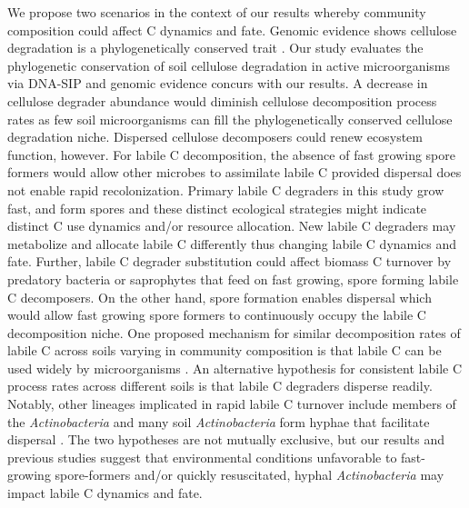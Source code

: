 We propose two scenarios in the context of our results whereby community
composition could affect C dynamics and fate. Genomic evidence shows cellulose
degradation is a phylogenetically conserved trait \citep{Berlemont2013}. Our
study evaluates the phylogenetic conservation of soil cellulose degradation in
active microorganisms via DNA-SIP and genomic evidence concurs with our
results. A decrease in cellulose degrader abundance would diminish cellulose
decomposition process rates as few soil microorganisms can fill the
phylogenetically conserved cellulose degradation niche. Dispersed cellulose
decomposers could renew ecosystem function, however. For labile
C decomposition, the absence of fast growing spore formers would allow other
microbes to assimilate labile C provided dispersal does not enable rapid
recolonization. Primary labile C degraders in this study grow fast, and
form spores and these distinct ecological strategies might indicate distinct
C use dynamics and/or resource allocation. New labile C degraders may
metabolize and allocate labile C differently thus changing labile C dynamics
and fate. Further, labile C degrader substitution could affect biomass
C turnover by predatory bacteria or saprophytes that feed on fast growing,
spore forming labile C decomposers. On the other hand, spore formation enables
dispersal \citep{Nicholson2000} which would allow fast growing spore formers to
continuously occupy the labile C decomposition niche. One proposed mechanism
for similar decomposition rates of labile C across soils varying in community
composition is that labile C can be used widely by microorganisms
\citep{McGuire2010}. An alternative hypothesis for consistent labile C process
rates across different soils is that labile C degraders disperse readily.
Notably, other lineages implicated in rapid labile C turnover include members
of the \textit{Actinobacteria} \citep{Placella2012} and many soil
\textit{Actinobacteria} form hyphae that facilitate dispersal
\citep{KILLHAM2007}. The two hypotheses are not mutually exclusive, but our
results and previous studies suggest that environmental conditions unfavorable
to fast-growing spore-formers and/or quickly resuscitated, hyphal
\textit{Actinobacteria} may impact labile C dynamics and fate.

